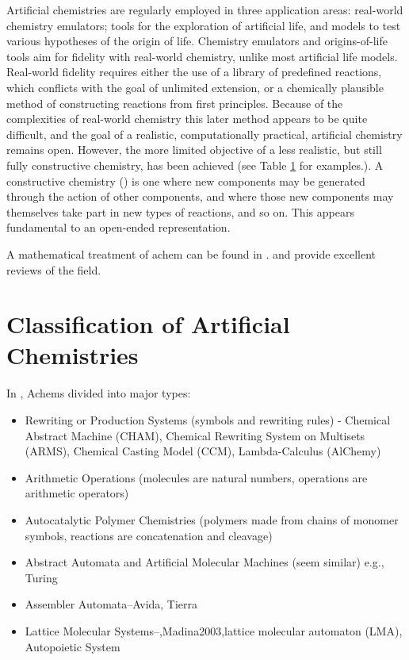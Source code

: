 Artificial chemistries are regularly employed in three application
areas: real-world chemistry emulators; tools for the exploration of
artificial life, and models to test various hypotheses of the origin of
life. Chemistry emulators and origins-of-life tools aim for fidelity
with real-world chemistry, unlike most artificial life models.
Real-world fidelity requires either the use of a library of predefined
reactions, which conflicts with the goal of unlimited extension, or a
chemically plausible method of constructing reactions from first
principles. Because of the complexities of real-world chemistry this
later method appears to be quite difficult, and the goal of a realistic,
computationally practical, artificial chemistry remains open. However,
the more limited objective of a less realistic, but still fully
constructive chemistry, has been achieved (see Table \cref{classification-of-artificial-chemistries} for
examples.). A constructive chemistry (\autocite{Fontana1994}) is one
where new components may be generated through the action of other
components, and where those new components may themselves take part in
new types of reactions, and so on. This appears fundamental to an
open-ended representation.

A mathematical treatment of \gls{achem} can be found in
\autocite{Benko2009}. \autocite{Dittrich:2001zr} and
\autocite{Suzuki2008a} provide excellent reviews of the field.

\section{Classification of Artificial Chemistries}\label{classification-of-artificial-chemistries}

In \autocite{Dittrich:2001zr}, Achems divided into major types:

\begin{itemize}
	\item
 Rewriting or Production Systems (symbols and rewriting rules) -
 Chemical Abstract Machine (CHAM), Chemical Rewriting System on
 Multisets (ARMS), Chemical Casting Model (CCM), Lambda-Calculus
 (AlChemy)
	\item
 Arithmetic Operations (molecules are natural numbers, operations are
 arithmetic operators)
	\item
 Autocatalytic Polymer Chemistries (polymers made from chains of
 monomer symbols, reactions are concatenation and cleavage)
	\item
 Abstract Automata and Artificial Molecular Machines (seem similar)
 e.g., Turing
	\item
 Assembler Automata--Avida, Tierra
	\item
 Lattice Molecular Systems--\autocite{Ono2000},Madina2003,lattice
 molecular automaton (LMA), Autopoietic System
\end{itemize}

